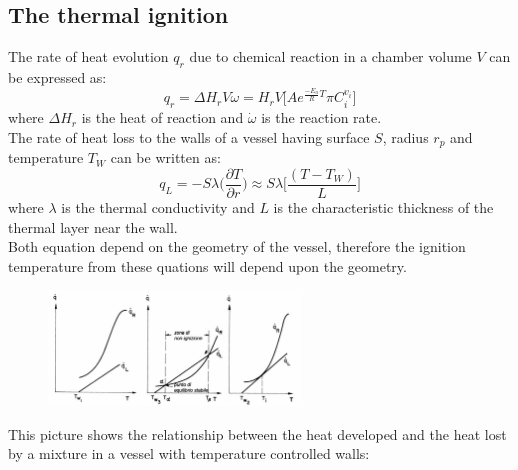 \documentclass[12pt]{article}
\begin{document}
\subsection{The thermal ignition}

The rate of heat evolution $q_{r}$ due to chemical reaction in a chamber volume $V$ can be expressed as:
\begin{equation}
    q_{r}=\Delta H_{r} V \dot{\omega} = H_{r} V \bigg[Ae^{\frac{-E_{a}}{R}T} \pi C_{i}^{v_{i}}\bigg]
\end{equation}
where $\Delta H_{r}$ is the heat of reaction and $\dot{\omega}$ is the reaction rate.\\
The rate of heat loss to the walls of a vessel having surface $S$, radius $r_{p}$ and temperature $T_{W}$ can be written as:
\begin{equation}
    q_{L} = -S \lambda \bigg(\frac{\partial T}{\partial r}\bigg) \approx S \lambda\bigg[\frac {(T-T_{W})}{L}\bigg]
\end{equation}
where $\lambda$ is the thermal conductivity and $L$ is the characteristic thickness of the thermal layer near the wall.\\
Both equation depend on the geometry of the vessel, therefore the ignition temperature from these quations will depend upon the geometry.

\begin{figure}[h!]
\centering
\includegraphics[width=0.6\textwidth]{figures/thermallossgain.png}
\end{figure}

This picture shows the relationship between the heat developed and the heat lost by a mixture in a vessel with temperature controlled walls:
\end{document}
